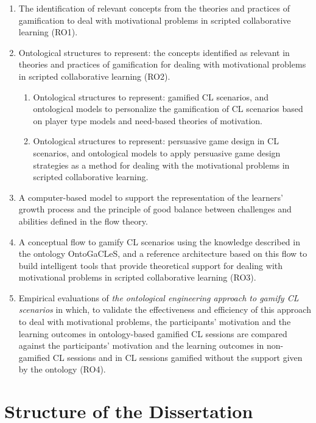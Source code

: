 \begin{enumerate}
\item 
The identification of relevant concepts from the theories and practices of gamification to deal with motivational problems in scripted collaborative learning (RO1).

\item
Ontological structures to represent: the concepts identified as relevant in theories and practices of gamification for dealing with motivational problems in scripted collaborative learning (RO2).

\begin{enumerate}
\item
Ontological structures to represent: gamified CL scenarios, and ontological models to personalize the gamification of CL scenarios based on player type models and need-based theories of motivation.

\item
Ontological structures to represent: persuasive game design in CL scenarios, and ontological models to apply persuasive game design strategies as a method for dealing with the motivational problems in scripted collaborative learning.
\end{enumerate}

\item 
A computer-based model to support the representation of the learners' growth process and the principle of good balance between challenges and abilities defined in the flow theory.

\item
A conceptual flow to gamify CL scenarios using the knowledge described in the ontology OntoGaCLeS, and a reference architecture based on this flow to build intelligent tools that provide theoretical support for dealing with motivational problems in scripted collaborative learning (RO3).

\item
Empirical evaluations of \emph{the ontological engineering approach to gamify CL scenarios} in which, to validate the effectiveness and efficiency of this approach to deal with motivational problems, the participants' motivation and the learning outcomes in ontology-based gamified CL sessions are compared against the participants' motivation and the learning outcomes in non-gamified CL sessions and in CL sessions gamified without the support given by the ontology (RO4).
\end{enumerate}

\section{Structure of the Dissertation}
\label{sec:structure-of-dissertation}

